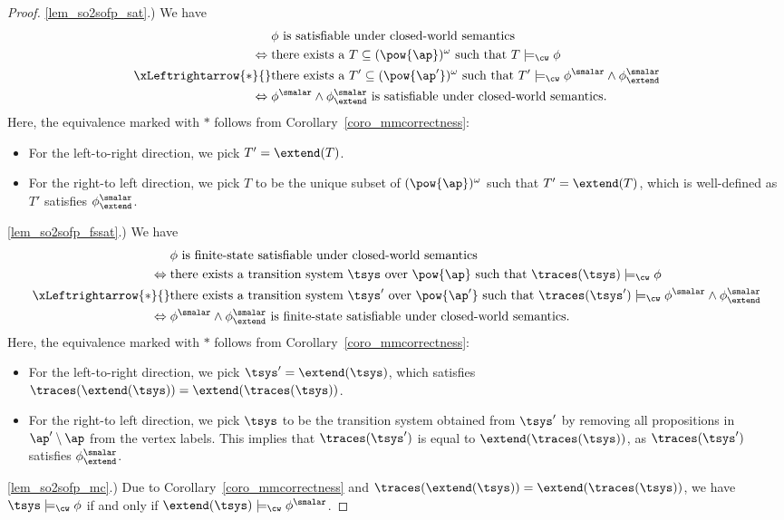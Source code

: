 \begin{proof}
\ref{lem_so2sofp_sat}.) 
We have
\begin{align*}
{}&{} \text{$\phi$ is satisfiable under closed-world semantics}\\
\Leftrightarrow {}&{} \text{there exists a $T \subseteq (\pow{\ap})^\omega$ such that $ T \models_\cw \phi$}\\
\xLeftrightarrow{\ast} {}&{} \text{there exists a $T' \subseteq (\pow{\ap'})^\omega$ such that $ T' \models_\cw \phi^{\smalar}\wedge \phi_\extend^{\smalar}$}\\
\Leftrightarrow {}&{} \text{$\phi^{\smalar} \wedge \phi_\extend^{\smalar}$ is satisfiable under closed-world semantics.}
\end{align*}
Here, the equivalence marked with $\ast$ follows from Corollary~\ref{coro_mmcorrectness}:
\begin{itemize}
    \item For the left-to-right direction, we pick $T' = \extend(T)$. 
    \item For the right-to left direction, we pick $T$ to be the unique subset of $(\pow{\ap})^\omega$ such that $T' = \extend(T)$, which is well-defined as $T'$ satisfies $\phi_\extend^{\smalar}$. 
\end{itemize}

\ref{lem_so2sofp_fssat}.)
We have
\begin{align*}
{}&{} \text{$\phi$ is finite-state satisfiable under closed-world semantics}\\
\Leftrightarrow {}&{} \text{there exists a transition system~$\tsys$ over $\pow{\ap}$ such that $\traces(\tsys) \models_\cw \phi$}\\
\xLeftrightarrow{\ast} {}&{} \text{there exists a transition system~$\tsys'$ over $\pow{\ap'}$ such that $\traces(\tsys') \models_\cw \phi^{\smalar}\wedge \phi_\extend^{\smalar}$}\\
\Leftrightarrow {}&{} \text{$\phi^{\smalar} \wedge \phi_\extend^{\smalar}$ is finite-state satisfiable under closed-world semantics.}
\end{align*}
Here, the equivalence marked with $\ast$ follows from Corollary~\ref{coro_mmcorrectness}:
\begin{itemize}
    \item For the left-to-right direction, we pick $\tsys' = \extend(\tsys)$, which satisfies $\traces(\extend(\tsys)) = \extend(\traces(\tsys))$.
    \item For the right-to left direction, we pick $\tsys$ to be the transition system obtained from $\tsys'$ by removing all propositions in $\ap' \setminus \ap$ from the vertex labels.
    This implies that $\traces(\tsys')$ is equal to $\extend(\traces(\tsys))$, as $\traces(\tsys')$ satisfies $\phi_\extend^{\smalar}$.
\end{itemize}

\ref{lem_so2sofp_mc}.) 
Due to Corollary~\ref{coro_mmcorrectness} and $\traces(\extend(\tsys)) = \extend(\traces(\tsys))$, we have $\tsys \models_\cw \phi$ if and only if $\extend(\tsys)\models_\cw \phi^\smalar$.
\end{proof}

